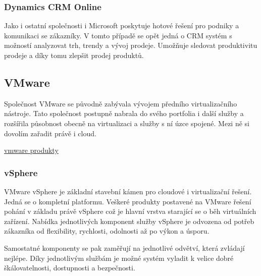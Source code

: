 \subsubsection{Dynamics CRM Online}
Jako i ostatní společnosti i Microsoft poskytuje hotové řešení pro podniky a komunikaci se zákazníky. V tomto případě se opět jedná o CRM systém s možností analyzovat trh, trendy a vývoj prodeje. Umožňuje sledovat produktivitu prodeje a díky tomu zlepšit prodej produktů.

\subsection{VMware}
Společnost VMware se původně zabývala vývojem předního virtualizačního nástroje. Tato společnost postupně nabrala do svého portfolia i další služby a rozšířila působnost obecně na virtualizaci a služby s ní úzce spojené. Mezi ně si dovolím zařadit právě i cloud.

\href{http://www.vmware.com/cz/products.html}{vmware produkty}

\subsubsection{vSphere}
\label{sec:vSphere}
\nocite{vmware:vSphere}
VMware vSphere je základní stavební kámen pro cloudové i virtualizační řešení. Jedná se o kompletní platformu. Veškeré produkty postavené na VMware řešení pohání v základu právě vSphere což je hlavní vrstva starající se o běh virtuálních zařízení. Nabídka jednotlivých komponent služby vSphere je odvozena od potřeb zákazníka od flexibility, rychlosti, odolnosti až po výkon a úsporu.

Samostatné komponenty se pak zaměřují na jednotlivé odvětví, která zvládají nejlépe. Díky jednotlivým službám je možné systém vyladit k velice dobré škálovatelnosti, dostupnosti a bezpečnosti.

